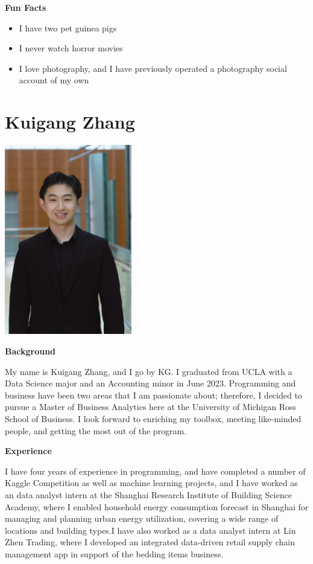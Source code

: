 \documentclass[
]{book}
\begin{document}
\textbf{Fun Facts}

\begin{itemize}
\item
  I have two pet guinea pigs
\item
  I never watch horror movies
\item
  I love photography, and I have previously operated a photography social account of my own
\end{itemize}

\hypertarget{kuigang-zhang}{%
\section{Kuigang Zhang}\label{kuigang-zhang}}

\includegraphics[width=2.1875in,height=\textheight]{KG Photo.png}

\textbf{Background}

My name is Kuigang Zhang, and I go by KG. I graduated from UCLA with a Data Science major and an Accounting minor in June 2023. Programming and business have been two areas that I am passionate about; therefore, I decided to pursue a Master of Business Analytics here at the University of Michigan Ross School of Business. I look forward to enriching my toolbox, meeting like-minded people, and getting the most out of the program.

\textbf{Experience}

I have four years of experience in programming, and have completed a number of Kaggle Competition as well as machine learning projects, and I have worked as an data analyst intern at the Shanghai Research Institute of Building Science Academy, where I enabled household energy consumption forecast in Shanghai for managing and planning urban energy utilization, covering a wide range of locations and building types.I have also worked as a data analyst intern at Lin Zhen Trading, where I developed an integrated data-driven retail supply chain management app in support of the bedding items business.
\end{document}
